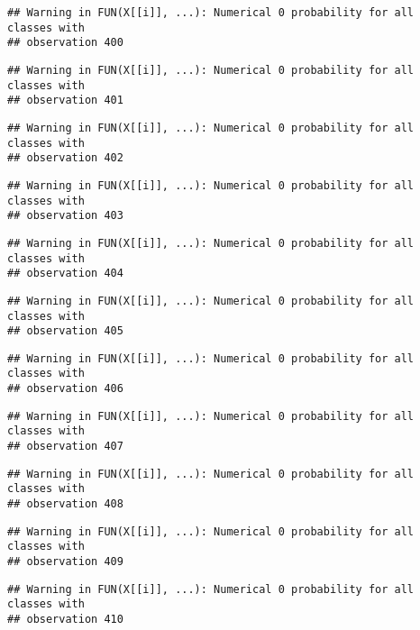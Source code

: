 \documentclass[
]{article}
\begin{document}
\begin{verbatim}
## Warning in FUN(X[[i]], ...): Numerical 0 probability for all classes with
## observation 400
\end{verbatim}

\begin{verbatim}
## Warning in FUN(X[[i]], ...): Numerical 0 probability for all classes with
## observation 401
\end{verbatim}

\begin{verbatim}
## Warning in FUN(X[[i]], ...): Numerical 0 probability for all classes with
## observation 402
\end{verbatim}

\begin{verbatim}
## Warning in FUN(X[[i]], ...): Numerical 0 probability for all classes with
## observation 403
\end{verbatim}

\begin{verbatim}
## Warning in FUN(X[[i]], ...): Numerical 0 probability for all classes with
## observation 404
\end{verbatim}

\begin{verbatim}
## Warning in FUN(X[[i]], ...): Numerical 0 probability for all classes with
## observation 405
\end{verbatim}

\begin{verbatim}
## Warning in FUN(X[[i]], ...): Numerical 0 probability for all classes with
## observation 406
\end{verbatim}

\begin{verbatim}
## Warning in FUN(X[[i]], ...): Numerical 0 probability for all classes with
## observation 407
\end{verbatim}

\begin{verbatim}
## Warning in FUN(X[[i]], ...): Numerical 0 probability for all classes with
## observation 408
\end{verbatim}

\begin{verbatim}
## Warning in FUN(X[[i]], ...): Numerical 0 probability for all classes with
## observation 409
\end{verbatim}

\begin{verbatim}
## Warning in FUN(X[[i]], ...): Numerical 0 probability for all classes with
## observation 410
\end{verbatim}
\end{document}
